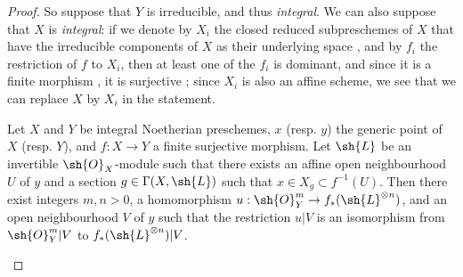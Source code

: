 \begin{proof}
So suppose that $Y$ is irreducible, and thus \emph{integral}.
We can also suppose that $X$ is \emph{integral}:
if we denote by $X_i$ the closed reduced subpreschemes of $X$ that have the irreducible components of $X$ as their underlying space , and by $f_i$ the restriction of $f$ to $X_i$, then at least one of the $f_i$ is dominant, and since it is a finite morphism , it is surjective ;
since $X_i$ is also an affine scheme, we see that we can replace $X$ by $X_i$ in the statement.

  \begin{lemma}[6.7.1.1]
  \label{II.6.7.1.1}
  Let $X$ and $Y$ be integral Noetherian preschemes, $x$ (resp. $y$) the generic point of $X$ (resp. $Y$), and $f:X\to Y$ a finite surjective morphism.
  Let $\sh{L}$ be an invertible $\sh{O}_X$-module such that there exists an affine open neighbourhood $U$ of $y$ and a section $g\in\Gamma(X,\sh{L})$ such that $x\in X_g\subset f^{-1}(U)$.
  Then there exist integers $m,n>0$, a homomorphism $u:\sh{O}_Y^m\to f_*(\sh{L}^{\otimes n})$, and an open neighbourhood $V$ of $y$ such that the restriction $u|V$ is an isomorphism from $\sh{O}_Y^m|V$ to $f_*(\sh{L}^{\otimes n})|V$.
  \end{lemma}


\end{proof}
